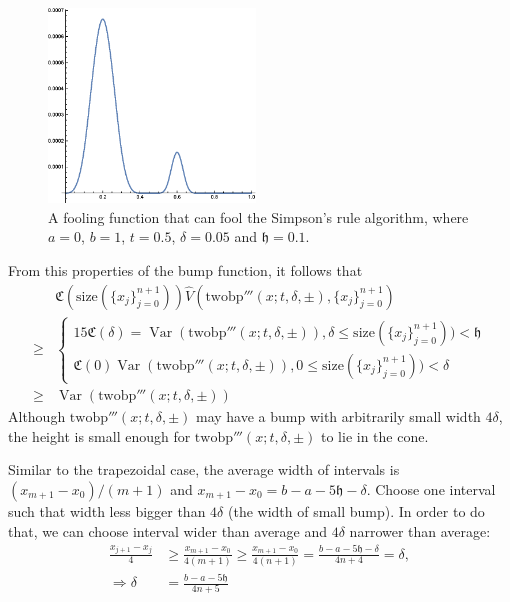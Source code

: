 \documentclass{iitthesis}
\DeclareMathOperator{\Var}{Var}
\theoremstyle{definition}
\theoremstyle{remark}
\begin{document}
\begin{figure}[ht]
\centering
\includegraphics[width=5.5cm]{twobp.eps}
\caption{A fooling function that can fool the Simpson's rule algorithm, where $a=0$, $b=1$, $t=0.5$, $\delta=0.05$ and $\mathfrak{h}=0.1$. \label{fig:twobpfunction}}
\end{figure}

From this properties of the bump function, it follows that
\begin{align*}
  &\mathfrak{C}(\text{size}(\{x_j\}_{j=0}^{n+1}))\widehat{V}(\text{twobp}'''(x;t,\delta,\pm),\{x_j\}_{j=0}^{n+1})\\
  \ge & \begin{cases} \displaystyle 15\mathfrak{C}(\delta)=\Var(\text{twobp}'''(x;t,\delta,\pm)), \delta \le \text{size}(\{x_j\}_{j=0}^{n+1})) <\mathfrak{h}\\[1ex]
                      \displaystyle \mathfrak{C}(0)\Var(\text{twobp}'''(x;t,\delta,\pm)), 0\le \text{size}(\{x_j\}_{j=0}^{n+1}))<\delta
        \end{cases}\\
  \ge & \Var(\text{twobp}'''(x;t,\delta,\pm))
\end{align*}
Although $\text{twobp}'''(x;t,\delta,\pm)$ may have a bump with arbitrarily small width $4\delta$, the height is small enough for $\text{twobp}'''(x;t,\delta,\pm)$ to lie in the cone.

Similar to the trapezoidal case, the average width of intervals is $(x_{m+1}-x_{0})/(m+1)$ and $x_{m+1}-x_{0}=b-a-5\mathfrak{h}-\delta$. Choose one interval such that width less bigger than $4\delta$ (the width of small bump). In order to do that, we can choose interval wider than average and $4\delta$ narrower than average:
  \begin{align*}
    \frac{x_{j+1}-x_{j}}{4}&\ge\frac{x_{m+1}-x_{0}}{4(m+1)}\ge\frac{x_{m+1}-x_{0}}{4(n+1)}=\frac{b-a-5\mathfrak{h}-\delta}{4n+4}=\delta,\\
    \Rightarrow \delta&=\frac{b-a-5\mathfrak{h}}{4n+5}
  \end{align*}
\end{document}
